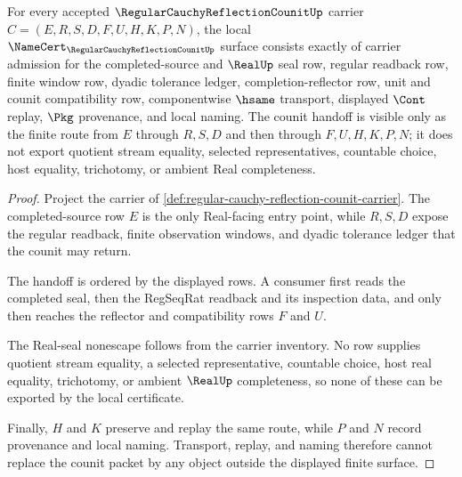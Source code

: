 \begin{theorem}
\label{thm:regular-cauchy-reflection-counit-namecert-obligations}
For every accepted $\RegularCauchyReflectionCounitUp$ carrier $C=(E,R,S,D,F,U,H,K,P,N)$, the local $\NameCert_{\RegularCauchyReflectionCounitUp}$ surface consists exactly of carrier admission for the completed-source and $\RealUp$ seal row, regular readback row, finite window row, dyadic tolerance ledger, completion-reflector row, unit and counit compatibility row, componentwise $\hsame$ transport, displayed $\Cont$ replay, $\Pkg$ provenance, and local naming. The counit handoff is visible only as the finite route from $E$ through $R,S,D$ and then through $F,U,H,K,P,N$; it does not export quotient stream equality, selected representatives, countable choice, host equality, trichotomy, or ambient Real completeness.
\end{theorem}
\begin{proof}
Project the carrier of \autoref{def:regular-cauchy-reflection-counit-carrier}. The completed-source row $E$ is the only Real-facing entry point, while $R,S,D$ expose the regular readback, finite observation windows, and dyadic tolerance ledger that the counit may return.

The handoff is ordered by the displayed rows. A consumer first reads the completed seal, then the RegSeqRat readback and its inspection data, and only then reaches the reflector and compatibility rows $F$ and $U$.

The Real-seal nonescape follows from the carrier inventory. No row supplies quotient stream equality, a selected representative, countable choice, host real equality, trichotomy, or ambient $\RealUp$ completeness, so none of these can be exported by the local certificate.

Finally, $H$ and $K$ preserve and replay the same route, while $P$ and $N$ record provenance and local naming. Transport, replay, and naming therefore cannot replace the counit packet by any object outside the displayed finite surface.
\end{proof}

